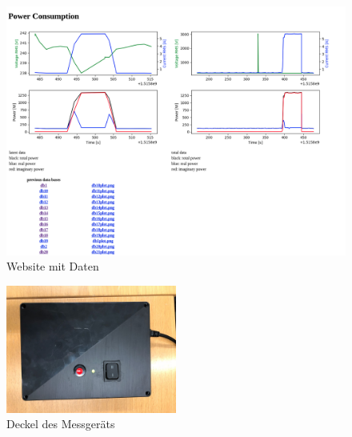 \documentclass[a4paper]{article}
\begin{document}
\begin{figure}[h]
	\centering
	\includegraphics[width=\textwidth]{webpage_screen_dump.png}
	\caption{Website mit Daten}
	\label{website}
\end{figure}

\begin{figure}[h]
	\centering
	\includegraphics[width=0.5\textwidth, angle=-90]{manual_deckel.jpeg}
	\caption{Deckel des Messgeräts}
	\label{deckel}
\end{figure}
\end{document}
